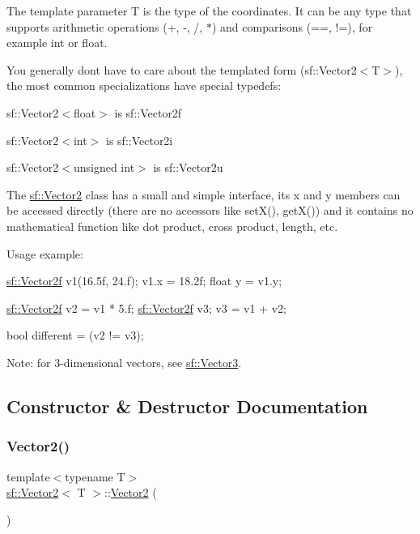 The template parameter T is the type of the coordinates. It can be any type that supports arithmetic operations (+, -\/, /, $\ast$) and comparisons (==, !=), for example int or float.

You generally don\textquotesingle{}t have to care about the templated form (sf\+::\+Vector2$<$\+T$>$), the most common specializations have special typedefs\+: \begin{DoxyItemize}
\item sf\+::\+Vector2$<$float$>$ is sf\+::\+Vector2f \item sf\+::\+Vector2$<$int$>$ is sf\+::\+Vector2i \item sf\+::\+Vector2$<$unsigned int$>$ is sf\+::\+Vector2u\end{DoxyItemize}
The \hyperlink{classsf_1_1_vector2}{sf\+::\+Vector2} class has a small and simple interface, its x and y members can be accessed directly (there are no accessors like set\+X(), get\+X()) and it contains no mathematical function like dot product, cross product, length, etc.

Usage example\+: 
\begin{DoxyCode}
\hyperlink{classsf_1_1_vector2}{sf::Vector2f} v1(16.5f, 24.f);
v1.x = 18.2f;
\textcolor{keywordtype}{float} y = v1.y;

\hyperlink{classsf_1_1_vector2}{sf::Vector2f} v2 = v1 * 5.f;
\hyperlink{classsf_1_1_vector2}{sf::Vector2f} v3;
v3 = v1 + v2;

\textcolor{keywordtype}{bool} different = (v2 != v3);
\end{DoxyCode}


Note\+: for 3-\/dimensional vectors, see \hyperlink{classsf_1_1_vector3}{sf\+::\+Vector3}. 

\subsection{Constructor \& Destructor Documentation}
\mbox{\label{classsf_1_1_vector2_a58c32383b5291380db4b43a289f75988}} 
\subsubsection{\texorpdfstring{Vector2()}{Vector2()}\hspace{0.1cm}{\footnotesize\ttfamily [1/3]}}
{\footnotesize\ttfamily template$<$typename T$>$ \\
\hyperlink{classsf_1_1_vector2}{sf\+::\+Vector2}$<$ T $>$\+::\hyperlink{classsf_1_1_vector2}{Vector2} (\begin{DoxyParamCaption}{ }\end{DoxyParamCaption})}



